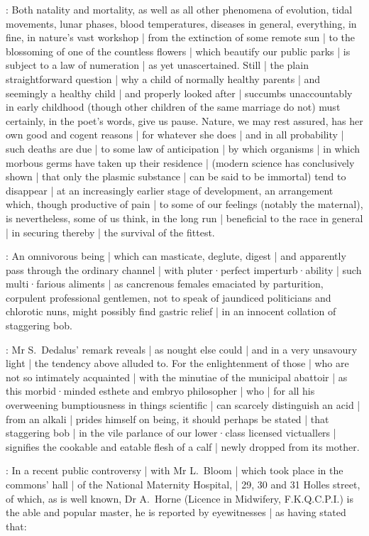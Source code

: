\lynch:
Both natality and mortality,
as well as all other phenomena of evolution,
tidal movements,
lunar phases,
blood temperatures,
diseases in general,
everything,
in fine,
in nature's vast workshop |
from the extinction of some remote sun |
to the blossoming of one of the countless flowers |
which beautify our public parks |
is subject to a law of numeration |
as yet unascertained.
Still |
the plain straightforward question |
why a child of normally healthy parents |
and seemingly a healthy child |
and properly looked after |
succumbs unaccountably in early childhood
(though other children of the same marriage do not)
must certainly,
in the poet's words,
give us pause.
Nature,
we may rest assured,
has her own good and cogent reasons |
for whatever she does |
and in all probability |
such deaths are due |
to some law of anticipation |
by which organisms |
in which morbous germs have taken up their residence |
(modern science has conclusively shown |
that only the plasmic substance |
can be said to be immortal)
tend to disappear |
at an increasingly earlier stage of development,
an arrangement which,
though productive of pain |
to some of our feelings
(notably the maternal),
is nevertheless,
some of us think,
in the long run |
beneficial to the race in general |
in securing thereby |
the survival of the fittest.

\stephen:
An omnivorous being |
which can masticate,
deglute,
digest |
and apparently pass through the ordinary channel |
with pluter·perfect imperturb·ability |
such multi·farious aliments |
as cancrenous females emaciated by parturition,
corpulent professional gentlemen,
not to speak of jaundiced politicians and chlorotic nuns,
might possibly find gastric relief |
in an innocent collation of staggering bob.

:
Mr S.~Dedalus' remark reveals |
as nought else could |
and in a very unsavoury light |
the tendency above alluded to.
For the enlightenment of those |
who are not so intimately acquainted |
with the minutiae of the municipal abattoir |
as this morbid·minded esthete and embryo philosopher |
who |
for all his overweening bumptiousness in things scientific |
can scarcely distinguish an acid |
from an alkali |
prides himself on being,
it should perhaps be stated |
that staggering bob |
in the vile parlance of our lower·class licensed victuallers |
signifies the cookable and eatable flesh of a calf |
newly dropped from its mother.

:
In a recent public controversy |
with Mr L.~Bloom |
which took place in the commons' hall |
of the National Maternity Hospital, |
29, 30 and 31 Holles street,
of which,
as is well known,
Dr A.~Horne
(Licence in Midwifery, F.K.Q.C.P.I.)
is the able and popular master,
he is reported by eyewitnesses |
as having stated that:

